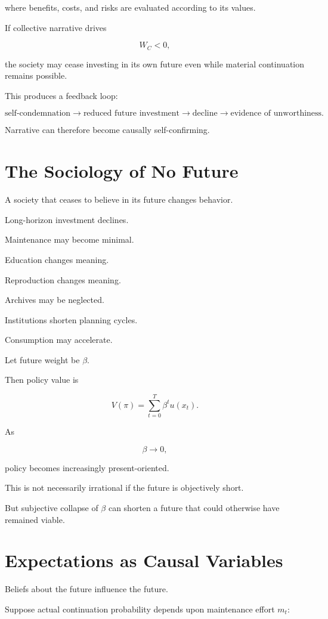 \documentclass[11pt,oneside]{book}
\theoremstyle{definition}
\theoremstyle{remark}
\begin{document}
where benefits, costs, and risks are evaluated according to its values.

If collective narrative drives

\[
W_C<0,
\]

the society may cease investing in its own future even while material continuation remains possible.

This produces a feedback loop:

\[
\text{self-condemnation}
\rightarrow
\text{reduced future investment}
\rightarrow
\text{decline}
\rightarrow
\text{evidence of unworthiness}.
\]

Narrative can therefore become causally self-confirming.

\section{The Sociology of No Future}

A society that ceases to believe in its future changes behavior.

Long-horizon investment declines.

Maintenance may become minimal.

Education changes meaning.

Reproduction changes meaning.

Archives may be neglected.

Institutions shorten planning cycles.

Consumption may accelerate.

Let future weight be \(\beta\).

Then policy value is

\[
V(\pi)
=
\sum_{t=0}^{T}
\beta^t u(x_t).
\]

As

\[
\beta\rightarrow0,
\]

policy becomes increasingly present-oriented.

This is not necessarily irrational if the future is objectively short.

But subjective collapse of \(\beta\) can shorten a future that could otherwise have remained viable.

\section{Expectations as Causal Variables}

Beliefs about the future influence the future.

Suppose actual continuation probability depends upon maintenance effort \(m_t\):
\end{document}
